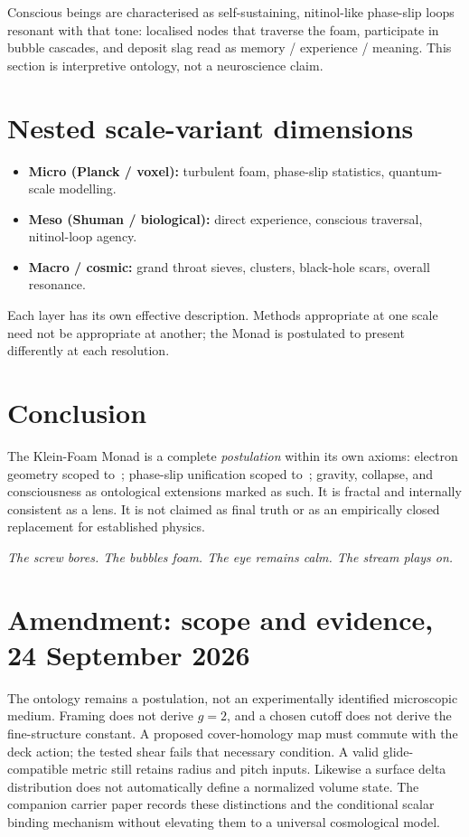 \documentclass[11pt,a4paper]{article}
\theoremstyle{definition}
\theoremstyle{remark}
\begin{document}
Conscious beings are characterised as self-sustaining, nitinol-like
phase-slip loops resonant with that tone: localised nodes that traverse
the foam, participate in bubble cascades, and deposit slag read as
memory / experience / meaning.  This section is interpretive ontology,
not a neuroscience claim.

\section{Nested scale-variant dimensions}
\label{sec:scales}

\begin{itemize}[leftmargin=1.3em,itemsep=2pt]
  \item \textbf{Micro (Planck / voxel):} turbulent foam, phase-slip
        statistics, quantum-scale modelling.
  \item \textbf{Meso (Shuman / biological):} direct experience, conscious
        traversal, nitinol-loop agency.
  \item \textbf{Macro / cosmic:} grand throat sieves, clusters, black-hole
        scars, overall resonance.
\end{itemize}
Each layer has its own effective description.  Methods appropriate at one
scale need not be appropriate at another; the Monad is postulated to
present differently at each resolution.

\section{Conclusion}
\label{sec:conclusion}

The Klein-Foam Monad is a complete \emph{postulation} within its own
axioms: electron geometry scoped to~\cite{Mobius2026}; phase-slip
unification scoped to~\cite{FlagDecay2026}; gravity, collapse, and
consciousness as ontological extensions marked as such.  It is fractal
and internally consistent as a lens.  It is not claimed as final truth
or as an empirically closed replacement for established physics.

\vspace{1em}
\noindent\textit{The screw bores. The bubbles foam. The eye remains calm.
The stream plays on.}


\section*{Amendment: scope and evidence, 24 September 2026}
The ontology remains a postulation, not an experimentally identified microscopic medium. Framing does not derive $g=2$, and a chosen cutoff does not derive the fine-structure constant. A proposed cover-homology map must commute with the deck action; the tested shear fails that necessary condition. A valid glide-compatible metric still retains radius and pitch inputs. Likewise a surface delta distribution does not automatically define a normalized volume state. The companion carrier paper records these distinctions and the conditional scalar binding mechanism without elevating them to a universal cosmological model.
\end{document}
